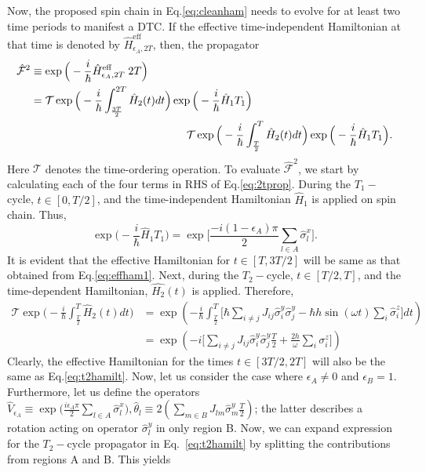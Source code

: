 \documentclass[12pt]{iopart}
\begin{document}
Now, the proposed spin chain in Eq.\eqref{eq:cleanham} needs to evolve for at least two time periods to manifest a DTC. If the effective time-independent Hamiltonian at that time is denoted by $\hat{H}^{\mathrm{eff}}_{\epsilon_A, 2T}$, then, the propagator
\begin{align}
    \hat{\mathcal{F}}^{2} &\equiv \exp\Big(-\frac{i}{\hbar}\hat{H}_{\epsilon_A, 2T}^{\mathrm{eff}}\;2T\Big) \label{eq:heff}\\ 
    &= \mathcal{T}\exp\Big(-\frac{i}{\hbar}\int_{\frac{3T}{2}}^{2T}\hat{H}_2(t) dt\Big)
    \exp\Big(-\frac{i}{\hbar}\hat{H}_1T_1\Big)\nonumber\\
    & \hskip 5cm \mathcal{T}\exp\Big(-\frac{i}{\hbar}\int_{\frac{T}{2}}^{T}\hat{H}_2(t) dt\Big)\exp\Big(-\frac{i}{\hbar}\hat{H}_1T_1\Big).
    \label{eq:2tprop}
\end{align}
Here $\mathcal{T}$ denotes the time-ordering operation. 
To evaluate $\hat{\mathcal{F}}^2$, we start by calculating each of the four terms in RHS of Eq.\ref{eq:2tprop}. During the $T_1-$cycle, $t\in[0,T/2]$, and the time-independent Hamiltonian $\hat{H}_1$ is applied on spin chain. Thus,
\begin{equation}
    \exp\Big(-\frac{i}{\hbar} \hat{H}_1 T_1\Big) = 	\exp\Bigg[\frac{-i(1-\epsilon_A)\pi}{2}\sum_{l \in A}\hat{\sigma}^x_l\Bigg].
    \label{eq:effham1}
\end{equation}	
It is evident that the effective Hamiltonian for $t \in[T, 3T/2]$ will be same as that obtained from Eq.\eqref{eq:effham1}. Next, during the $T_2-$cycle, $t\in[T/2,T]$, and the time-dependent Hamiltonian, $\hat{H_2}(t)$ is applied. Therefore,
\begin{align}
    \mathcal{T}\exp\Big(-\frac{i}{\hbar}\int_{\frac{T}{2}}^{T}\hat{H}_2(t) dt\Big) &= \exp( -\frac{i}{\hbar}\int_{\frac{T}{2}}^{T}\Big[\hbar\sum_{i\neq j}J_{ij}\hat{\sigma}^y_i\hat{\sigma}^y_j-\hbar h\sin(\omega t)\sum_i\hat{\sigma}^z_i\Big] dt)\nonumber\\
    &= \exp(-i \Big[\sum_{i\neq j}J_{ij}\hat{\sigma}^y_i\hat{\sigma}^y_j \frac{T}{2} + \frac{2h}{\omega}\sum_i \sigma^z_i\Big])
    \label{eq:t2hamilt}
\end{align}
Clearly, the effective Hamiltonian for the times  $t \in[3T/2, 2T]$ will also be the same as Eq.\eqref{eq:t2hamilt}. Now,	let us consider the case where $\epsilon_A \neq 0$ and $\epsilon_B=1$. Furthermore, let us define the operators $\displaystyle \hat{V}_{\epsilon_A} \equiv \exp\Big(\frac{i\epsilon_A \pi}{2}\sum_{l\in A}\hat{\sigma}^x_l\Big), \displaystyle \hat{\theta}_l \equiv 2 \left(\sum_{m \in B}J_{lm}\hat{\sigma}^y_m \frac{T}{2} \right)$; the latter describes a rotation acting on operator $\hat{\sigma}^y_l$ in only region B.  Now, we can expand expression for the  $T_2-$cycle propagator in Eq.~\ref{eq:t2hamilt} by splitting the contributions from regions A and B. This yields
\end{document}

